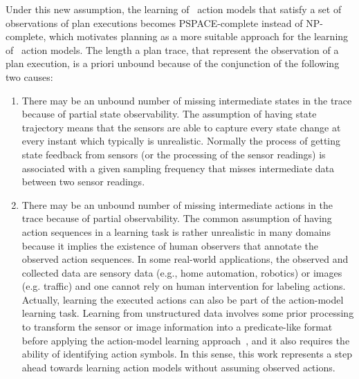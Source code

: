 Under this new assumption, the learning of \strips\ action models that satisfy a set of observations of plan executions becomes PSPACE-complete instead of NP-complete, which motivates planning as a more  suitable approach for the learning of \strips\ action models. The length a plan trace, that represent the observation of a plan execution, is a priori unbound because of the conjunction of the following two causes:
\begin{enumerate}
\item There may be an unbound number of missing intermediate states in the trace because of partial state observability. The assumption of having \FO state trajectory means that the sensors are able to capture every state change at every instant which typically is unrealistic. Normally the process of getting state feedback from sensors (or the processing of the sensor readings) is associated with a given sampling frequency that misses intermediate data between two sensor readings.

\item There may be an unbound number of missing intermediate actions in the trace because of partial observability. The common assumption of having \FO action sequences in a learning task is rather unrealistic in many domains because it implies the existence of human observers that annotate the observed action sequences. In some real-world applications, the observed and collected data are sensory data (e.g., home automation, robotics) or images (e.g. traffic) and one cannot rely on human intervention for labeling actions. Actually, learning the executed actions can also be part of the action-model learning task. Learning from unstructured data involves some prior processing to transform the sensor or image information into a predicate-like format before applying the action-model learning approach~\cite{AsaiF18}, and it also requires the ability of identifying action symbols. In this sense, this work represents a step ahead towards learning action models without assuming observed actions.
\end{enumerate}

